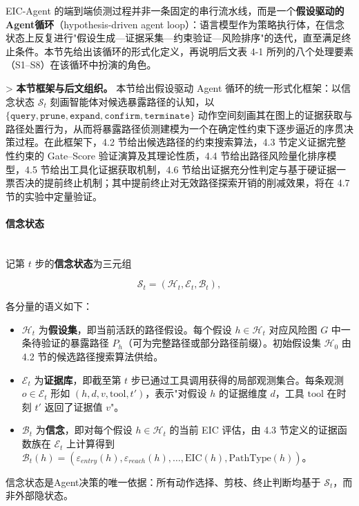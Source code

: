 \documentclass[a4paper,12pt]{ctexart}
\begin{document}
EIC-Agent 的端到端侦测过程并非一条固定的串行流水线，而是一个\textbf{假设驱动的Agent循环}（hypothesis-driven agent loop）：语言模型作为策略执行体，在信念状态上反复进行"假设生成—证据采集—约束验证—风险排序"的迭代，直至满足终止条件。本节先给出该循环的形式化定义，再说明后文表 4-1 所列的八个处理要素（S1–S8）在该循环中扮演的角色。

\textgreater{} \textbf{本节框架与后文组织。} 本节给出假设驱动 Agent 循环的统一形式化框架：以信念状态 $\mathcal{S}_t$ 刻画智能体对候选暴露路径的认知，以 $\{\texttt{query}, \texttt{prune}, \texttt{expand}, \texttt{confirm}, \texttt{terminate}\}$ 动作空间刻画其在图上的证据获取与路径处置行为，从而将暴露路径侦测建模为一个在确定性约束下逐步逼近的序贯决策过程。在此框架下，4.2 节给出候选路径的约束搜索算法，4.3 节定义证据完整性约束的 Gate–Score 验证演算及其理论性质，4.4 节给出路径风险量化排序模型，4.5 节给出工具化证据获取机制，4.6 节给出证据充分性判定与基于硬证据一票否决的提前终止机制；其中提前终止对无效路径探索开销的削减效果，将在 4.7 节的实验中定量验证。

\paragraph{信念状态}\mbox{}\\

记第 $t$ 步的\textbf{信念状态}为三元组

\[
\mathcal{S}_t = (\mathcal{H}_t, \mathcal{E}_t, \mathcal{B}_t),
\]

各分量的语义如下：

\begin{itemize}[leftmargin=*]
\item $\mathcal{H}_t$ 为\textbf{假设集}，即当前活跃的路径假设。每个假设 $h \in \mathcal{H}_t$ 对应风险图 $G$ 中一条待验证的暴露路径 $P_h$（可为完整路径或部分路径前缀）。初始假设集 $\mathcal{H}_0$ 由 4.2 节的候选路径搜索算法供给。
\item $\mathcal{E}_t$ 为\textbf{证据库}，即截至第 $t$ 步已通过工具调用获得的局部观测集合。每条观测 $o \in \mathcal{E}_t$ 形如 $(h, d, v, \text{tool}, t')$，表示"对假设 $h$ 的证据维度 $d$，工具 $\text{tool}$ 在时刻 $t'$ 返回了证据值 $v$"。
\item $\mathcal{B}_t$ 为\textbf{信念}，即对每个假设 $h \in \mathcal{H}_t$ 的当前 EIC 评估，由 4.3 节定义的证据函数族在 $\mathcal{E}_t$ 上计算得到 $\mathcal{B}_t(h) = (\varepsilon_{entry}(h), \varepsilon_{reach}(h), \dots, \text{EIC}(h), \text{PathType}(h))$。
\end{itemize}

信念状态是Agent决策的唯一依据：所有动作选择、剪枝、终止判断均基于 $\mathcal{S}_t$，而非外部隐状态。
\end{document}
